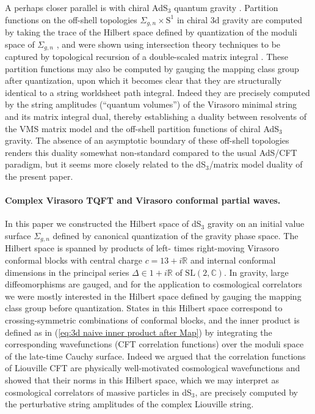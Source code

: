 \documentclass[12pt,a4paper]{article}
\newcommand\SL{\text{SL}}
\begin{document}
A perhaps closer parallel is with chiral AdS$_3$ quantum gravity \cite{Eberhardt:2022wlc}. Partition functions on the off-shell topologies $\Sigma_{g,n}\times \text{S}^1$ in chiral 3d gravity are computed by taking the trace of the Hilbert space defined by quantization of the moduli space of $\Sigma_{g,n}$ \cite{Maloney:2015ina}, and were shown using intersection theory techniques to be captured by topological recursion of a double-scaled matrix integral \cite{Eberhardt:2022wlc}.
These partition functions may also be computed by gauging the mapping class group after quantization, upon which it becomes clear that they are structurally identical to a string worldsheet path integral. Indeed they are precisely computed by the string amplitudes (``quantum volumes'') of the Virasoro minimal string \cite{Collier:2023cyw} and its matrix integral dual, thereby establishing a duality between resolvents of the VMS matrix model and the off-shell partition functions of chiral AdS$_3$ gravity. The absence of an asymptotic boundary of these off-shell topologies renders this duality somewhat non-standard compared to the usual AdS/CFT paradigm, but it seems more closely related to the dS$_3$/matrix model duality of the present paper.

\paragraph{Complex Virasoro TQFT and Virasoro conformal partial waves.} 
In this paper we constructed the Hilbert space of dS$_3$ gravity on an initial value surface $\Sigma_{g,n}$ defined by canonical quantization of the gravity phase space. The Hilbert space is spanned by products of left- times right-moving Virasoro conformal blocks with central charge $c = 13 + i\mathbb{R}$ and internal conformal dimensions in the principal series $\Delta\in 1+ i\mathbb{R}$ of $\SL(2,\mathbb{C})$. In gravity, large diffeomorphisms are gauged, and for the application to cosmological correlators we were mostly interested in the Hilbert space defined by gauging the mapping class group before quantization. States in this Hilbert space correspond to crossing-symmetric combinations of conformal blocks, and the inner product is defined as in (\ref{eq:3d naive inner product after Map}) by integrating the corresponding wavefunctions (CFT correlation functions) over the moduli space of the late-time Cauchy surface. Indeed we argued that the correlation functions of Liouville CFT are physically well-motivated cosmological wavefunctions and showed that their norms in this Hilbert space, which we may interpret as cosmological correlators of massive particles in dS$_3$, are precisely computed by the perturbative string amplitudes of the complex Liouville string.
\end{document}

